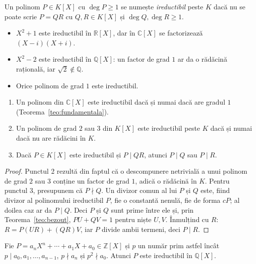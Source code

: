 \begin{definitie}
Un polinom $P \in K[X]$ cu $\deg P \ge 1$ se numește \emph{ireductibil} peste $K$ dacă nu se poate scrie $P = QR$ cu $Q, R \in K[X]$ și $\deg Q, \deg R \ge 1$.
\end{definitie}

\begin{exemplu}
\begin{itemize}
    \item $X^2 + 1$ este ireductibil în $\mathbb{R}[X]$, dar în $\mathbb{C}[X]$ se factorizează $(X - i)(X + i)$.
    \item $X^2 - 2$ este ireductibil în $\mathbb{Q}[X]$: un factor de grad $1$ ar da o rădăcină rațională, iar $\sqrt{2} \notin \mathbb{Q}$.
    \item Orice polinom de grad $1$ este ireductibil.
\end{itemize}
\end{exemplu}

\begin{propozitie}\label{prop:ireductibil}
\begin{enumerate}
    \item Un polinom din $\mathbb{C}[X]$ este ireductibil dacă și numai dacă are gradul $1$ (Teorema~\ref{teo:fundamentala}).
    \item Un polinom de grad $2$ sau $3$ din $K[X]$ este ireductibil peste $K$ dacă și numai dacă nu are rădăcini în $K$.
    \item Dacă $P \in K[X]$ este ireductibil și $P \mid QR$, atunci $P \mid Q$ sau $P \mid R$.
\end{enumerate}
\end{propozitie}

\begin{proof}
Punctul 2 rezultă din faptul că o descompunere netrivială a unui polinom de grad $2$ sau $3$ conține un factor de grad $1$, adică o rădăcină în $K$. Pentru punctul 3, presupunem că $P \nmid Q$. Un divizor comun al lui $P$ și $Q$ este, fiind divizor al polinomului ireductibil $P$, fie o constantă nenulă, fie de forma $cP$; al doilea caz ar da $P \mid Q$. Deci $P$ și $Q$ sunt prime între ele și, prin Teorema~\ref{teo:bezout}, $PU + QV = 1$ pentru niște $U, V$. Înmulțind cu $R$: $R = P(UR) + (QR)V$, iar $P$ divide ambii termeni, deci $P \mid R$.
\end{proof}

\begin{teorema}
Fie $P = a_n X^n + \cdots + a_1 X + a_0 \in \mathbb{Z}[X]$ și $p$ un număr prim astfel încât $p \mid a_0, a_1, \ldots, a_{n-1}$, $p \nmid a_n$ și $p^2 \nmid a_0$. Atunci $P$ este ireductibil în $\mathbb{Q}[X]$.
\end{teorema}

